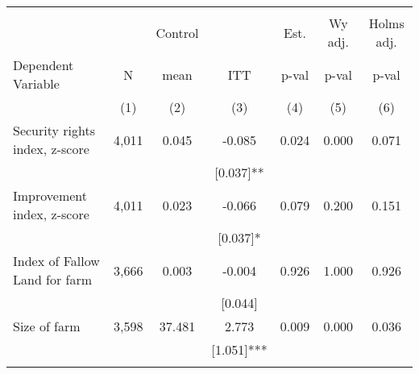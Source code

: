 \begin{tabular}{lcccccc}
\hline \noalign{\smallskip} &  &  &  &  &  & \\
 &  & Control &  & Est. & Wy adj. & Holms adj.\\
Dependent Variable & N & mean & ITT & p-val & p-val & p-val\\
 & (1) & (2) & (3) & (4) & (5) & (6)\\
\noalign{\smallskip}\hline \noalign{\smallskip}Security rights index, z-score & 4,011 & 0.045 & -0.085 & 0.024 & 0.000 & 0.071\\
 &  &  & [0.037]** &  &  & \\
Improvement index, z-score & 4,011 & 0.023 & -0.066 & 0.079 & 0.200 & 0.151\\
 &  &  & [0.037]* &  &  & \\
Index of Fallow Land for farm & 3,666 & 0.003 & -0.004 & 0.926 & 1.000 & 0.926\\
 &  &  & [0.044] &  &  & \\
Size of farm & 3,598 & 37.481 & 2.773 & 0.009 & 0.000 & 0.036\\
 &  &  & [1.051]*** &  &  & \\
\noalign{\smallskip}\hline\end{tabular}
